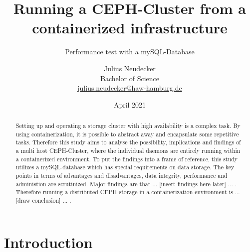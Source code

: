\documentclass[titlepage, a4paper, 11pt]{scrartcl}
\title{Running a CEPH-Cluster from a containerized infrastructure}
\subtitle{Performance test with a mySQL-Database}
\author{Julius Neudecker \\ Bachelor of Science \\ \href{mailto:julius.neudecker@haw-hamburg.de}{julius.neudecker@haw-hamburg.de}}
\date{April 2021}
\begin{document}
    \maketitle

    \tableofcontents

    \begin{abstract}


        Setting up and operating a storage cluster with high availability is a complex task. 
        By using containerization, it is possible to abstract away and encapsulate some repetitive tasks.
        Therefore this study aims to analyse the possibility, implications and findings of a multi host
        CEPH-Cluster, where the individual daemons are entirely running within a containerized environment.
        To put the findings into a frame of reference, this study utilizes a mySQL-database which has 
        special requirements on data storage. The key points in terms of advantages and disadvantages,
        data integrity, performance and administion are scrutinized. Major findings are that ...
        [insert findings here later] ... .
        Therefore running a distributed CEPH-storage in a containerization environment is ... 
        [draw conclusion] ... .



    \end{abstract}

    \section{Introduction}
\end{document}

